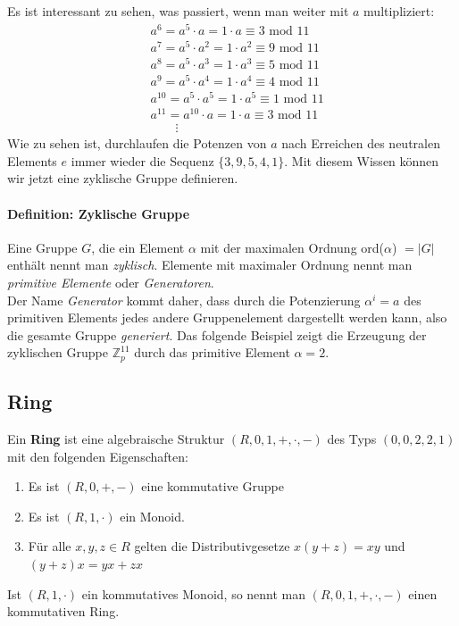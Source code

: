 Es ist interessant zu sehen, was passiert, wenn man weiter mit $a$ multipliziert:
\begin{align*}
&a^6 = a^5 \cdot a = 1 \cdot a \equiv 3 \text{ mod } 11\\
&a^7 = a^5 \cdot a^2 = 1 \cdot a^2 \equiv 9 \text{ mod } 11\\
&a^8 = a^5 \cdot a^3 = 1 \cdot a^3 \equiv 5 \text{ mod } 11\\
&a^9 = a^5 \cdot a^4 = 1 \cdot a^4 \equiv 4 \text{ mod } 11\\
&a^{10} = a^5 \cdot a^5 = 1 \cdot a^5 \equiv 1 \text{ mod } 11\\
&a^{11} = a^{10} \cdot a = 1 \cdot a \equiv 3 \text{ mod } 11\\
&\qquad \vdots
\end{align*}
Wie zu sehen ist, durchlaufen die Potenzen von $a$ nach Erreichen des neutralen Elements $e$ immer wieder die Sequenz $\{3,9,5,4,1\}$. Mit diesem Wissen können wir jetzt eine zyklische Gruppe definieren.

\paragraph{Definition: Zyklische Gruppe}
Eine Gruppe $G$, die ein Element $\alpha$ mit der maximalen Ordnung ord($\alpha$) $= |G|$ enthält nennt man \textit{zyklisch}. Elemente mit maximaler Ordnung nennt man \textit{primitive Elemente} oder \textit{Generatoren}.\\

Der Name \textit{Generator} kommt daher, dass durch die Potenzierung $\alpha^i = a$ des primitiven Elements jedes andere Gruppenelement dargestellt werden kann, also die gesamte Gruppe \textit{generiert}. Das folgende Beispiel zeigt die Erzeugung der zyklischen Gruppe $\mathbb{Z}^{11}_p$ durch das primitive Element $\alpha = 2$.

\subsection{Ring}
Ein \textbf{Ring} ist eine algebraische Struktur $(R,0,1,+,\cdot,-)$ des Typs $(0,0,2,2,1)$ mit den folgenden Eigenschaften:
\begin{enumerate}
\item Es ist $(R,0,+,-)$ eine kommutative Gruppe
\item Es ist $(R,1,\cdot)$ ein Monoid.
\item Für alle $x,y,z \in R$ gelten die Distributivgesetze $x(y+z) = xy$ und $(y+z)x = yx +zx$
\end{enumerate}
Ist $(R,1,\cdot)$ ein kommutatives Monoid, so nennt man $(R,0,1,+,\cdot,-)$ einen kommutativen Ring.

